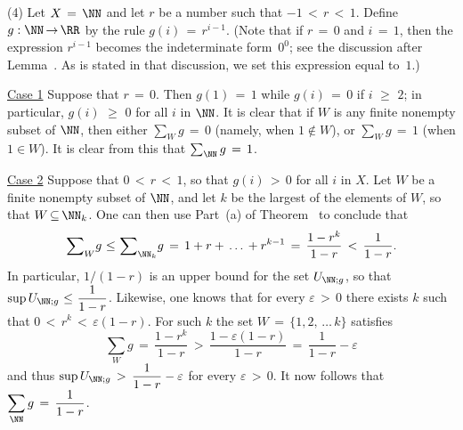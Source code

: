 \V

        (4) Let $X \,=\, {\NN}$ and let $r$ be a number such that $-1\,<\,r\,<\,1$.
    Define $g:{\NN} \,{\rightarrow}\, {\RR}$ by the rule $g(i) \,=\, r^{i-1}$.
    (Note that if $r \,=\, 0$ and $i \,=\, 1$, then the expression $r^{i-1}$ becomes the indeterminate form~$0^{0}$; see the discussion after Lemma~.
    As is stated in that discussion, we set this expression equal to~$1$.)


    \h\underline{Case 1} Suppose that $r \,=\, 0$. Then $g(1) \,=\, 1$ while $g(i) \,=\, 0$ if $i\,\,{\geq}\,\,2$;
    in particular, $g(i)\,\,{\geq}\,\,0$ for all $i$ in ${\NN}$. It is clear that if $W$ is any finite nonempty subset of ${\NN}$,
    then either $\sum_{W} g \,=\, 0$ (namely, when $1\not \in W$), or $\sum_{W} g \,=\, 1$ (when $1{\in}W$).
    It is clear from this that $\sum_{{\NN}} g \,=\, 1$.

       \h \underline{Case 2} Suppose that $0\,<\,r\,<\,1$, so that $g(i)\,>\,0$ for all $i$ in $X$.
    Let $W$ be a finite nonempty subset of ${\NN}$, and let $k$ be the largest of the elements of $W$, so that $W \,{\subseteq}\, {\NN}_{k}$.
    One can then use Part~(a) of Theorem~ to conclude that
        \begin{displaymath}
        {\sum}_{W} g\,\,{\leq}\,\,{\sum}_{{\NN}_{k}} g \,=\, 
    1 + r + \,{\ldots}\,+ r^{k-1} \,=\, \frac{1-r^{k}}{1-r}\,<\,\frac{1}{1-r}.
        \end{displaymath}
    In particular, $1/(1-r)$ is an upper bound for the set $U_{{\NN};g}$, so that ${\displaystyle {\sup}\,U_{{\NN};g}\,\,{\leq}\,\,\frac{1}{1-r}}$.
    Likewise, one knows that for every ${\varepsilon}\,>\,0$ there exists $k$ such that $0\,<\,r^{k}\,<\,{\varepsilon}(1-r)$.
    For such $k$ the set $W \,=\, \{1,2,\,{\ldots}\,k\}$ satisfies
        \begin{displaymath}
        {\sum}_{W} g \,=\, \frac{1-r^{k}}{1-r}\,>\,\frac{1-{\varepsilon}(1-r)}{1-r} \,=\, \frac{1}{1-r} - {\varepsilon}
        \end{displaymath}
    and thus ${\displaystyle {\sup}\,U_{{\NN};g}\,>\,\frac{1}{1-r} - {\varepsilon}}$ for every ${\varepsilon}\,>\,0$.
    It now follows that ${\displaystyle \sum_{{\NN}} g \,=\, \frac{1}{1-r}}$.

